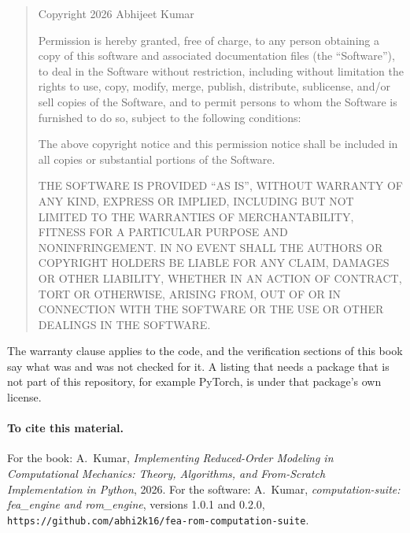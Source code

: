 \begin{quote}\small
Copyright \textcopyright{} 2026 Abhijeet Kumar

Permission is hereby granted, free of charge, to any person obtaining a copy of this software and associated documentation files (the ``Software''), to deal in the Software without restriction, including without limitation the rights to use, copy, modify, merge, publish, distribute, sublicense, and/or sell copies of the Software, and to permit persons to whom the Software is furnished to do so, subject to the following conditions:

The above copyright notice and this permission notice shall be included in all copies or substantial portions of the Software.

THE SOFTWARE IS PROVIDED ``AS IS'', WITHOUT WARRANTY OF ANY KIND, EXPRESS OR IMPLIED, INCLUDING BUT NOT LIMITED TO THE WARRANTIES OF MERCHANTABILITY, FITNESS FOR A PARTICULAR PURPOSE AND NONINFRINGEMENT. IN NO EVENT SHALL THE AUTHORS OR COPYRIGHT HOLDERS BE LIABLE FOR ANY CLAIM, DAMAGES OR OTHER LIABILITY, WHETHER IN AN ACTION OF CONTRACT, TORT OR OTHERWISE, ARISING FROM, OUT OF OR IN CONNECTION WITH THE SOFTWARE OR THE USE OR OTHER DEALINGS IN THE SOFTWARE.
\end{quote}

The warranty clause applies to the code, and the verification sections of this book say what was and was not checked for it. A listing that needs a package that is not part of this repository, for example PyTorch, is under that package's own license.

\paragraph{To cite this material.} For the book: A.~Kumar, \emph{Implementing Reduced-Order Modeling in Computational Mechanics: Theory, Algorithms, and From-Scratch Implementation in Python}, 2026. For the software: A.~Kumar, \emph{computation-suite: fea\_engine and rom\_engine}, versions 1.0.1 and 0.2.0, \texttt{https://github.com/abhi2k16/fea-rom-computation-suite}.
